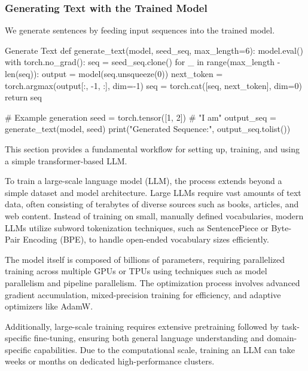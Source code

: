 \subsubsection{Generating Text with the Trained Model}
We generate sentences by feeding input sequences into the trained model.

\begin{codeonly}{Generate Text}
def generate_text(model, seed_seq, max_length=6):
    model.eval()
    with torch.no_grad():
        seq = seed_seq.clone()
        for _ in range(max_length - len(seq)):
            output = model(seq.unsqueeze(0))
            next_token = torch.argmax(output[:, -1, :], dim=-1)
            seq = torch.cat([seq, next_token], dim=0)
    return seq

# Example generation
seed = torch.tensor([1, 2])  # "I am"
output_seq = generate_text(model, seed)
print("Generated Sequence:", output_seq.tolist())
\end{codeonly}

This section provides a fundamental workflow for setting up, training, and using a simple transformer-based LLM.

To train a large-scale language model (LLM), the process extends beyond a simple dataset and model architecture. Large LLMs require vast amounts of text data, often consisting of terabytes of diverse sources such as books, articles, and web content. Instead of training on small, manually defined vocabularies, modern LLMs utilize subword tokenization techniques, such as SentencePiece or Byte-Pair Encoding (BPE), to handle open-ended vocabulary sizes efficiently. 

The model itself is composed of billions of parameters, requiring parallelized training across multiple GPUs or TPUs using techniques such as model parallelism and pipeline parallelism. The optimization process involves advanced gradient accumulation, mixed-precision training for efficiency, and adaptive optimizers like AdamW. 

Additionally, large-scale training requires extensive pretraining followed by task-specific fine-tuning, ensuring both general language understanding and domain-specific capabilities. Due to the computational scale, training an LLM can take weeks or months on dedicated high-performance clusters.

